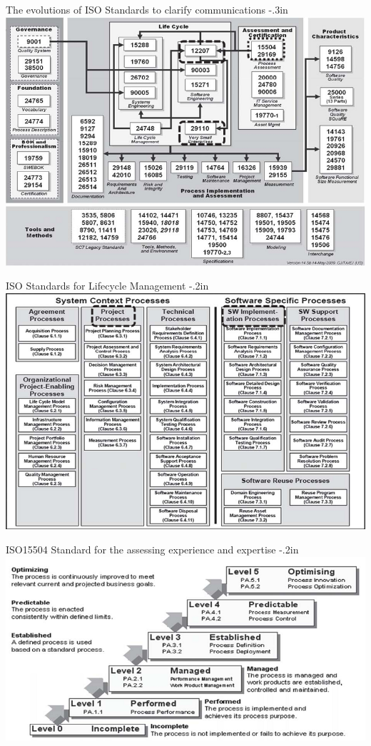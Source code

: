 \begin{frame}{The evolutions of ISO Standards to clarify communications}
\kern -.3in
\includegraphics[width=.9\textwidth]{isohistory.png}
\end{frame}

\begin{frame}{ISO Standards for Lifecycle Management}
\kern -.2in
\includegraphics[width=.85\textwidth]{isolifecycle.png}
\end{frame}

\begin{frame}{ISO15504 Standard for the assessing experience and expertise}
\kern -.2in
\includegraphics[width=.85\textwidth]{15504.png}
\end{frame}

